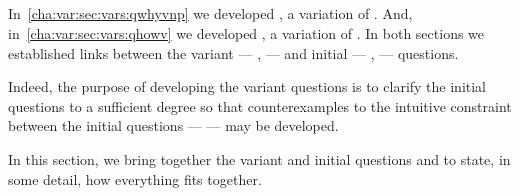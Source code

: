 

\subsection{\issueConstraint{}}
\label{cha:var:sec:vars:issue}

\begin{note}
  In~\autoref{cha:var:sec:vars:qwhyvnp} we developed \qWhyV{}, a variation of \qWhy{}.
  And, in~\autoref{cha:var:sec:vars:qhowv} we developed \qHowV{}, a variation of \qHow{}.
  In both sections we established links between the variant --- \qWhyV{}, \qHowV{}  --- and initial --- \qWhy{}, \qHow{} --- questions.

  Indeed, the purpose of developing the variant questions is to clarify the initial questions to a sufficient degree so that counterexamples to the intuitive constraint between the initial questions --- \issueInclusion{} --- may be developed.

  In this section, we bring together the variant and initial questions and \issueInclusion{} to state, in some detail, how everything fits together.
\end{note}


